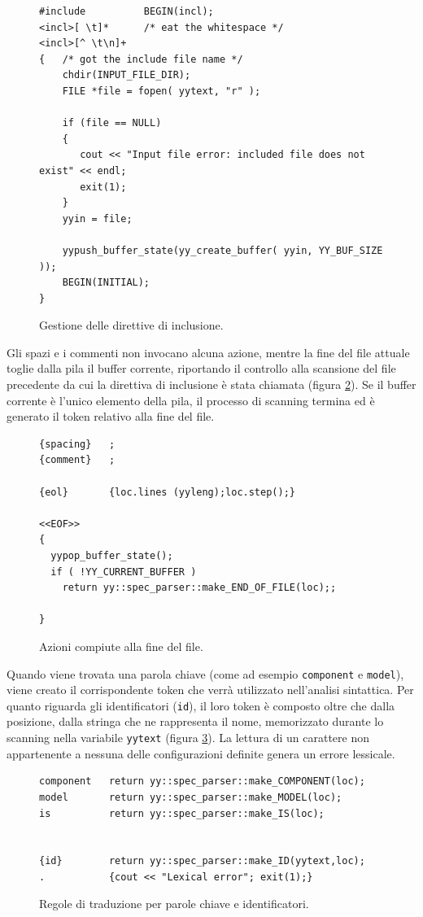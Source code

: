 \begin{figure}[htbp]
\begin{verbatim}
#include          BEGIN(incl);
<incl>[ \t]*      /* eat the whitespace */
<incl>[^ \t\n]+   
{   /* got the include file name */
    chdir(INPUT_FILE_DIR);
    FILE *file = fopen( yytext, "r" );

    if (file == NULL)
    {
       cout << "Input file error: included file does not exist" << endl;
       exit(1);
    }
    yyin = file;

    yypush_buffer_state(yy_create_buffer( yyin, YY_BUF_SIZE ));
    BEGIN(INITIAL);
}
\end{verbatim}
\caption{Gestione delle direttive di inclusione.}
\label{code:lex_rules}
\end{figure}

Gli spazi e i commenti non invocano alcuna azione, mentre la fine del file attuale toglie dalla pila il buffer corrente, riportando il controllo alla scansione del file precedente da cui la direttiva di inclusione è stata chiamata (figura \ref{code:lex_buff}). Se il buffer corrente è l'unico elemento della pila, il processo di scanning termina ed è generato il token relativo alla fine del file.

\begin{figure}[htbp]
\begin{verbatim}
{spacing}	;
{comment}   ;

{eol}		{loc.lines (yyleng);loc.step();}

<<EOF>>    
{
  yypop_buffer_state();
  if ( !YY_CURRENT_BUFFER )
    return yy::spec_parser::make_END_OF_FILE(loc);;
  
}
\end{verbatim}
\caption{Azioni compiute alla fine del file.}
\label{code:lex_buff}
\end{figure}

Quando viene trovata una parola chiave (come ad esempio \verb|component| e \verb|model|), viene creato il corrispondente token che verrà utilizzato nell'analisi sintattica.
Per quanto riguarda gli identificatori (\verb|id|), il loro token è composto oltre che dalla posizione, dalla stringa che ne rappresenta il nome, memorizzato durante lo scanning nella variabile \verb|yytext| (figura \ref{code:lex_id}).
La lettura di un carattere non appartenente a nessuna delle configurazioni definite genera un errore lessicale.

\begin{figure}[htbp]
\begin{verbatim}
component   return yy::spec_parser::make_COMPONENT(loc);
model       return yy::spec_parser::make_MODEL(loc);
is          return yy::spec_parser::make_IS(loc);


{id}        return yy::spec_parser::make_ID(yytext,loc);
.		    {cout << "Lexical error"; exit(1);}
\end{verbatim}
\caption{Regole di traduzione per parole chiave e identificatori.}
\label{code:lex_id}
\end{figure}

